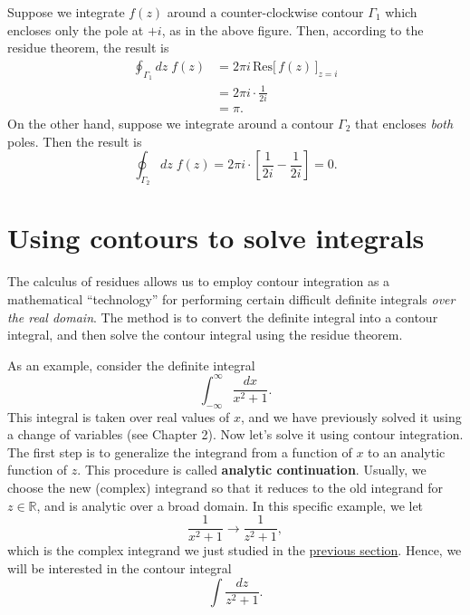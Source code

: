 \documentclass[10pt,a4paper]{article}
\begin{document}
Suppose we integrate $f(z)$ around a counter-clockwise contour
$\Gamma_1$ which encloses only the pole at $+i$, as in the above
figure.  Then, according to the residue theorem, the result is
\begin{align}
  \oint_{\Gamma_1}dz \; f(z) &=
  2\pi i\, \mathrm{Res}\big[\,f(z)\,\big]_{z = i} \\
  &= 2\pi i \cdot \frac{1}{2i} \\& = \pi.
\end{align}
On the other hand, suppose we integrate around a contour $\Gamma_2$
that encloses \textit{both} poles.  Then the result is
\begin{equation}
  \oint_{\Gamma_2}dz \; f(z) = 2\pi i \cdot \left[\frac{1}{2i} - \frac{1}{2i}\right] = 0.
\end{equation}
    
\section{Using contours to solve integrals}
\label{using-contours-to-solve-integrals}

The calculus of residues allows us to employ contour integration as a
mathematical ``technology'' for performing certain difficult definite
integrals \emph{over the real domain}. The method is to convert the
definite integral into a contour integral, and then solve the contour
integral using the residue theorem.

As an example, consider the definite integral
\begin{equation}
\int_{-\infty}^\infty \frac{dx}{x^2 + 1}.
\end{equation}
This integral is taken over real values of $x$, and we have previously
solved it using a change of variables (see Chapter 2). Now let's solve
it using contour integration. The first step is to generalize the
integrand from a function of $x$ to an analytic function of $z$. This
procedure is called \textbf{analytic continuation}. Usually, we choose
the new (complex) integrand so that it reduces to the old integrand
for $z \in \mathbb{R}$, and is analytic over a broad domain. In this
specific example, we let
\begin{equation}
  \frac{1}{x^2 + 1} \rightarrow \frac{1}{z^2 + 1},
\end{equation}
which is the complex integrand we just studied in the
\hyperref[loop_example]{previous section}. Hence, we will be
interested in the contour integral
\begin{equation}
\int \frac{dz}{z^2 + 1}.
\end{equation}
\end{document}
